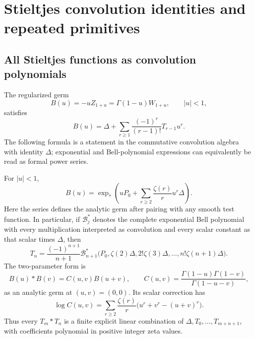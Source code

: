 \section{Stieltjes convolution identities and repeated primitives}
\label{per:sec:convolutions}

\subsection{All Stieltjes functions as convolution polynomials}

The regularized germ
\begin{equation}\label{per:eq:B}
 B(u)=-uZ_{1+u}=\Gamma(1-u)W_{1+u},\qquad |u|<1,
\end{equation}
satisfies
\begin{equation}\label{per:eq:Bseries}
 B(u)=\Delta+
       \sum_{r\ge1}\frac{(-1)^r}{(r-1)!}T_{r-1}u^r.
\end{equation}
The following formula is a statement in the commutative convolution
algebra with identity $\Delta$; exponential and Bell-polynomial
expressions can equivalently be read as formal power series.

\begin{theorem}
\label{per:thm:Bell}
For $|u|<1$,
\begin{equation}\label{per:eq:exp}
 B(u)=\exp_*\left(uP_0+
                    \sum_{r\ge2}\frac{\zeta(r)}{r}u^r\Delta\right).
\end{equation}
Here the series defines the analytic germ after pairing with any smooth
test function. In particular, if $\mathcal B_j^*$ denotes the complete
exponential Bell polynomial with every multiplication interpreted as
convolution and every scalar constant as that scalar times $\Delta$,
then
\begin{equation}\label{per:eq:Bell}
 T_n=\frac{(-1)^{n+1}}{n+1}
 \mathcal B_{n+1}^*
 \bigl(P_0,\zeta(2)\Delta,2!\zeta(3)\Delta,
                         \ldots,n!\zeta(n+1)\Delta\bigr).
\end{equation}
The two-parameter form is
\begin{equation}\label{per:eq:Bconv}
 B(u)*B(v)=C(u,v)B(u+v),
 \qquad C(u,v)=\frac{\Gamma(1-u)\Gamma(1-v)}{\Gamma(1-u-v)},
\end{equation}
as an analytic germ at $(u,v)=(0,0)$. Its scalar correction has
\begin{equation}\label{per:eq:C}
 \log C(u,v)=\sum_{r\ge2}\frac{\zeta(r)}{r}
                   \bigl(u^r+v^r-(u+v)^r\bigr).
\end{equation}
Thus every $T_m*T_n$ is a finite explicit linear combination of
$\Delta,T_0,\ldots,T_{m+n+1}$, with coefficients polynomial in positive
integer zeta values.
\end{theorem}

